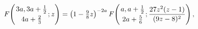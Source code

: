 \[\mathop{F\/}\nolimits\!\left({3a,3a+\frac{1}{2}\atop 4a+\frac{2}{3}};z\right)=%
\left(1-\tfrac{9}{8}z\right)^{-2a}\*\mathop{F\/}\nolimits\!\left({a,a+\frac{1}%
{2}\atop 2a+\frac{5}{6}};\frac{27z^{2}(z-1)}{(9z-8)^{2}}\right),\]
